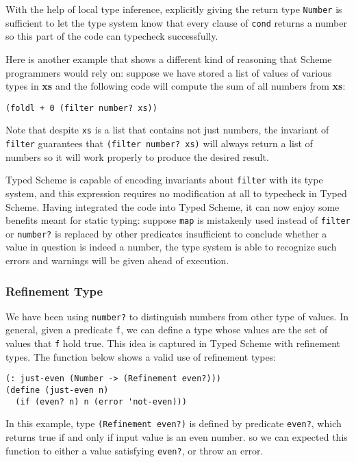 With the help of local type inference\cite{pierce2000local},
explicitly giving the return type \texttt{Number}
is sufficient to let the type system know that every clause of \texttt{cond} returns a number
so this part of the code can typecheck successfully.

Here is another example that shows a different kind of reasoning
that Scheme programmers would rely on:
suppose we have stored a list of values of various types in \textbf{xs}
and the following code will compute the sum of all numbers from \textbf{xs}:

\begin{verbatim}
(foldl + 0 (filter number? xs))
\end{verbatim}

Note that despite \texttt{xs} is a list that contains not just numbers,
the invariant of \texttt{filter} guarantees that
\texttt{(filter number? xs)} will always return a list of numbers
so it will work properly to produce the desired result.

Typed Scheme is capable of encoding invariants about \texttt{filter} with its type system,
and this expression requires no modification at all to typecheck in Typed Scheme.
Having integrated the code into Typed Scheme, it can now enjoy some benefits meant for static typing:
 suppose \texttt{map} is mistakenly
used instead of \texttt{filter} or \texttt{number?} is replaced by
other predicates insufficient to conclude whether a value in question is indeed a number,
the type system is able to recognize such errors and warnings will be given ahead of execution.

\subsubsection{Refinement Type}

We have been using \texttt{number?} to distinguish numbers
from other type of values.
In general, given a predicate \texttt{f}, we can define 
a type whose values are the set of values that \texttt{f} hold true.
This idea is captured in Typed Scheme with refinement types\cite{freeman1991refinement}.
The function below shows a valid use of refinement types:

\begin{verbatim}
(: just-even (Number -> (Refinement even?)))
(define (just-even n)
  (if (even? n) n (error 'not-even)))
\end{verbatim}

In this example, type \texttt{(Refinement even?)} is defined by predicate \texttt{even?},
which returns true if and only if input value is an even number.
so we can expected this function to either a value satisfying \texttt{even?}, or throw an error.

